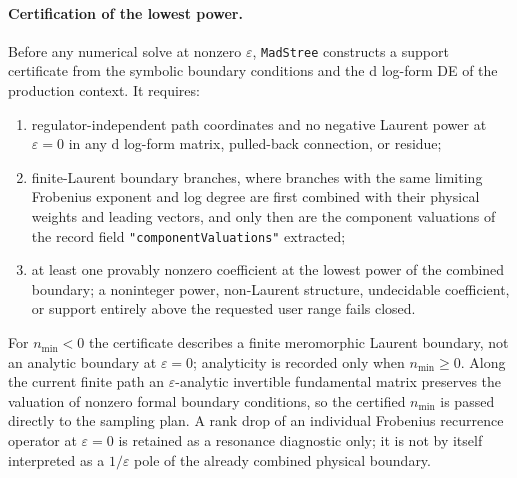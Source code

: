 \documentclass[11pt,a4paper]{article}
\numberwithin{table}{section}
\begin{document}
\paragraph{Certification of the lowest power.}
Before any numerical solve at nonzero $\varepsilon$, \texttt{MadStree} constructs a support
certificate from the symbolic boundary conditions and the d log-form DE of the production
context. It requires:
\begin{enumerate}
  \item regulator-independent path coordinates and no negative Laurent power at
        $\varepsilon=0$ in any d log-form matrix, pulled-back connection, or residue;
  \item finite-Laurent boundary branches, where branches with the same limiting Frobenius
        exponent and log degree are first combined with their physical weights and leading
        vectors, and only then are the component valuations of the record field
        \texttt{"componentValuations"} extracted;
  \item at least one provably nonzero coefficient at the lowest power of the combined
        boundary; a noninteger power, non-Laurent structure, undecidable coefficient, or
        support entirely above the requested user range fails closed.
\end{enumerate}
For $n_{\min}<0$ the certificate describes a finite meromorphic Laurent boundary, not an
analytic boundary at $\varepsilon=0$; analyticity is recorded only when $n_{\min}\geq0$.
Along the current finite path an $\varepsilon$-analytic invertible fundamental matrix
preserves the valuation of nonzero formal boundary conditions, so the certified $n_{\min}$ is
passed directly to the sampling plan. A rank drop of an individual Frobenius recurrence
operator at $\varepsilon=0$ is retained as a resonance diagnostic only; it is not by itself
interpreted as a $1/\varepsilon$ pole of the already combined physical boundary.
\end{document}
